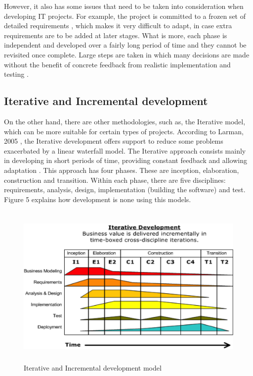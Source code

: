 \indent However, it also has some issues that need to be taken into consideration when developing IT projects. For example, the project is committed to a frozen set of detailed requirements \cite{larm}, which makes it very difficult to adapt, in case extra requirements are to be added at later stages. What is more, each phase is independent and developed over a fairly long period of time and they cannot be revisited once complete. Large steps are taken in which many decisions are made without the benefit of concrete feedback from realistic implementation and testing \cite{larm}.
 
\subsection{Iterative and Incremental development}
\indent On the other hand, there are other methodologies, such as, the Iterative model, which can be more suitable for certain types of projects. According to Larman, 2005 \cite{larm}, the Iterative development offers support to reduce some problems exacerbated by a linear waterfall model. The Iterative approach consists mainly in developing in short periods of time, providing constant feedback and allowing adaptation \cite{larm}.  This approach has four phases. These are inception, elaboration, construction and transition. Within each phase, there are five disciplines: requirements, analysis, design, implementation (building the software) and test\cite{cadle}. Figure 5 explains how development is none using this models.
 
\begin{figure}[H]
\includegraphics[width=12cm, height=8cm]{pics/methodology}
\centering
\caption{Iterative and Incremental development model}
\end{figure}
 
